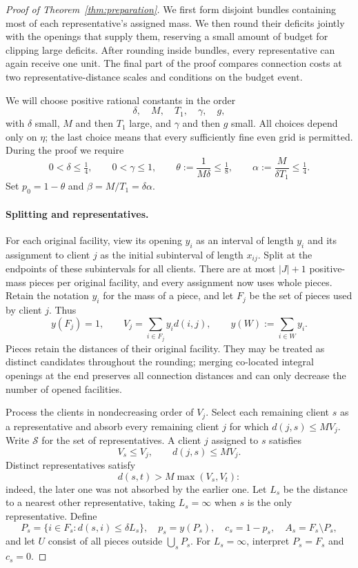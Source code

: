 \begin{proof}[Proof of Theorem~\ref{thm:preparation}]
We first form disjoint bundles containing most of each representative's
assigned mass. We then round their deficits jointly with the openings
that supply them, reserving a small amount of budget for clipping large
deficits. After rounding inside bundles, every representative can again
receive one unit. The final part of the proof compares connection costs
at two representative-distance scales and conditions on the budget event.

We will choose positive rational constants in the order
\[
 \delta,\quad M,\quad T_1,\quad\gamma,\quad g,
\]
with $\delta$ small, $M$ and then $T_1$ large, and $\gamma$ and then $g$
small.  All choices depend only on $\eta$; the last choice means that
every sufficiently fine even grid is permitted.  During the proof we
require
\begin{equation}\label{eq:prep-parameter-basics}
 0<\delta\le\tfrac14,\qquad 0<\gamma\le1,\qquad
 \theta:=\frac1{M\delta}\le\tfrac18,\qquad
 \alpha:=\frac M{\delta T_1}\le\tfrac14.
\end{equation}
Set $p_0=1-\theta$ and $\beta=M/T_1=\delta\alpha$.

\paragraph{Splitting and representatives.}
For each original facility, view its opening $y_i$ as an interval of
length $y_i$ and its assignment to client $j$ as the initial subinterval
of length $x_{ij}$.  Split at the endpoints of these subintervals for all
clients.  There are at most $|J|+1$ positive-mass pieces per original
facility, and every assignment now uses whole pieces.  Retain the
notation $y_i$ for the mass of a piece, and let $F_j$ be the set of pieces
used by client $j$.  Thus
\[
 y(F_j)=1,\qquad
 V_j=\sum_{i\in F_j}y_i d(i,j),\qquad
 y(W):=\sum_{i\in W}y_i.
\]
Pieces retain the distances of their original facility.  They may be
treated as distinct candidates throughout the rounding; merging
co-located integral openings at the end preserves all connection
distances and can only decrease the number of opened facilities.

Process the clients in nondecreasing order of $V_j$.  Select each
remaining client $s$ as a representative and absorb every remaining
client $j$ for which $d(j,s)\le MV_j$.  Write $\mathcal S$ for the set of
representatives.  A client $j$ assigned to $s$ satisfies
\begin{equation}\label{eq:prep-representative-properties}
 V_s\le V_j,\qquad d(j,s)\le MV_j.
\end{equation}
Distinct representatives satisfy
\[
 d(s,t)>M\max(V_s,V_t):
\]
indeed, the later one was not absorbed by the earlier one.  Let $L_s$ be
the distance to a nearest other representative, taking $L_s=\infty$
when $s$ is the only representative.  Define
\[
 P_s=\{i\in F_s:d(s,i)\le\delta L_s\},\quad
 p_s=y(P_s),\quad c_s=1-p_s,\quad A_s=F_s\setminus P_s,
\]
and let $U$ consist of all pieces outside $\bigcup_s P_s$.
For $L_s=\infty$, interpret $P_s=F_s$ and $c_s=0$.


\end{proof}
